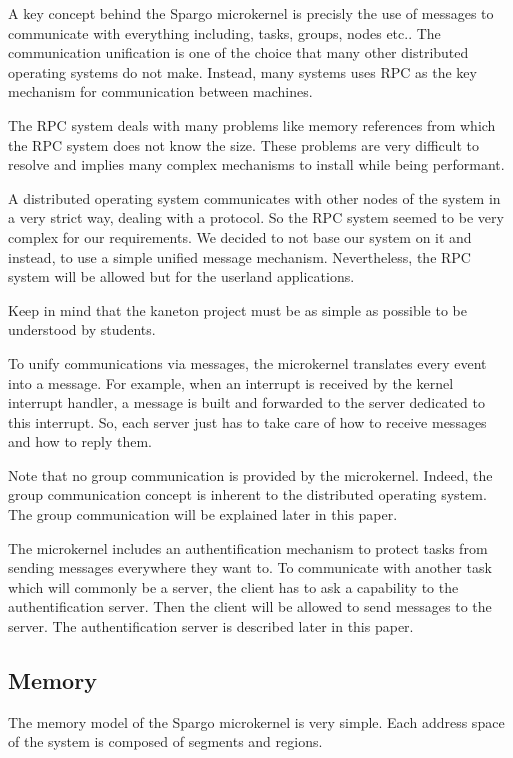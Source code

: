 \documentclass[10pt,a4wide]{article}
\begin{document}
\begin{multicols}{2}
A key concept behind the Spargo microkernel is precisly the use of messages
to communicate with everything including, tasks, groups, nodes etc..
The communication unification is one of the choice that many other distributed
operating systems do not make. Instead, many systems uses RPC as the key
mechanism for communication between machines.

The RPC system deals with many problems like memory references from which the
RPC system does not know the size. These problems are very difficult to
resolve and implies many complex mechanisms to install while being performant.

A distributed operating system communicates with other nodes of the system in
a very strict way, dealing with a protocol. So the RPC system seemed to be very
complex for our requirements. We decided to not base our system on it and
instead, to use a simple unified message mechanism. Nevertheless, the RPC
system will be allowed but for the userland applications.

Keep in mind that the kaneton project must be as simple as possible to be
understood by students.

To unify communications via messages, the microkernel translates every event
into a message. For example, when an interrupt is received by the kernel
interrupt handler, a message is built and forwarded to the server dedicated
to this interrupt. So, each server just has to take care of how to receive
messages and how to reply them.

Note that no group communication is provided by the microkernel. Indeed, the
group communication concept is inherent to the distributed operating system.
The group communication will be explained later in this paper.

The microkernel includes an authentification mechanism to protect tasks from
sending messages everywhere they want to. To communicate with another task
which will commonly be a server, the client has to ask a capability to
the authentification server. Then the client will be allowed to send messages
to the server. The authentification server is described later in this paper.

\subsection{Memory}

The memory model of the Spargo microkernel is very simple. Each address space
of the system is composed of segments and regions.


\end{multicols}
\end{document}
